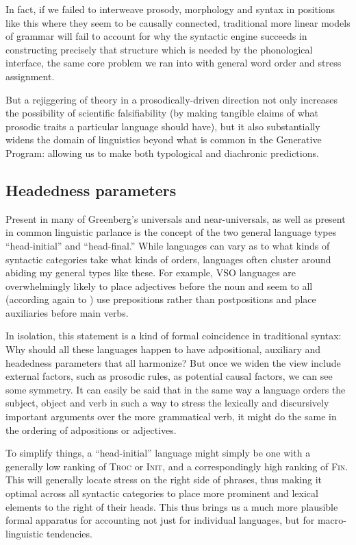 \documentclass{article}
\newcommand{\finphi}{\textsc{Fin\textphi}}
\newcommand{\initphi}{\textsc{Init\textphi}}
\newcommand{\troc}{\textsc{Troc}}
\begin{document}
In fact, if we failed to interweave prosody, morphology and syntax in positions like this where they seem to be causally connected, traditional more linear models of grammar will fail to account for why the syntactic engine succeeds in constructing precisely that structure which is needed by the phonological interface, the same core problem we ran into with general word order and stress assignment.

But a rejiggering of theory in a prosodically-driven direction not only increases the possibility of scientific falsifiability (by making tangible claims of what prosodic traits a particular language should have), but it also substantially widens the domain of linguistics beyond what is common in the Generative Program: allowing us to make both typological and diachronic predictions.

\subsection{Headedness parameters}

Present in many of Greenberg's universals and near-universals, as well as present in common linguistic parlance is the concept of the two general language types ``head-initial'' and ``head-final.''
While languages can vary as to what kinds of syntactic categories take what kinds of orders, languages often cluster around abiding my general types like these.
For example, VSO languages are overwhelmingly likely to place adjectives before the noun and seem to all (according again to \textcite{greenberg63}) use prepositions rather than postpositions and place auxiliaries before main verbs.

In isolation, this statement is a kind of formal coincidence in traditional syntax: Why should all these languages happen to have adpositional, auxiliary and headedness parameters that all harmonize? But once we widen the view include external factors, such as prosodic rules, as potential causal factors, we can see some symmetry.
It can easily be said that in the same way a language orders the subject, object and verb in such a way to stress the lexically and discursively important arguments over the more grammatical verb, it might do the same in the ordering of adpositions or adjectives.

To simplify things, a ``head-initial'' language might simply be one with a generally low ranking of {\troc} or {\initphi}, and a correspondingly high ranking of {\finphi}.
This will generally locate stress on the right side of phrases, thus making it optimal across all syntactic categories to place more prominent and lexical elements to the right of their heads.
This thus brings us a much more plausible formal apparatus for accounting not just for individual languages, but for macro-linguistic tendencies.
\end{document}
